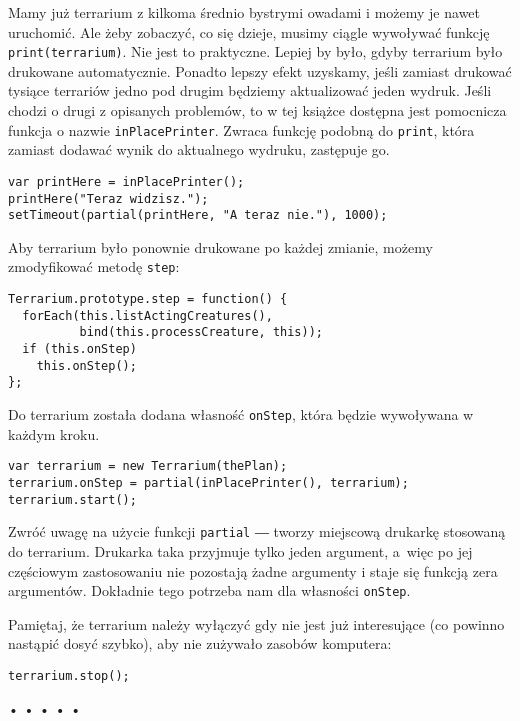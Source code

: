   
Mamy już terrarium z kilkoma średnio bystrymi owadami i możemy je nawet uruchomić. Ale żeby zobaczyć, co się dzieje, musimy ciągle wywoływać funkcję \texttt{print(terrarium)}. Nie jest to praktyczne. Lepiej by było, gdyby terrarium było drukowane automatycznie. Ponadto lepszy efekt uzyskamy, jeśli zamiast drukować tysiące terrariów jedno pod drugim będziemy aktualizować jeden wydruk. Jeśli chodzi o drugi z opisanych problemów, to w tej książce dostępna jest pomocnicza funkcja o nazwie \texttt{inPlacePrinter}. Zwraca funkcję podobną do \texttt{print}, która zamiast dodawać wynik do aktualnego wydruku, zastępuje go.

  
\begin{verbatim} 
var printHere = inPlacePrinter();
printHere("Teraz widzisz.");
setTimeout(partial(printHere, "A teraz nie."), 1000);
 \end{verbatim}
  
Aby terrarium było ponownie drukowane po każdej zmianie, możemy zmodyfikować metodę \texttt{step}:

  
\begin{verbatim} 
Terrarium.prototype.step = function() {
  forEach(this.listActingCreatures(),
          bind(this.processCreature, this));
  if (this.onStep)
    this.onStep();
};
 \end{verbatim}
  
Do terrarium została dodana własność \texttt{onStep}, która będzie wywoływana w każdym kroku.

  
\begin{verbatim} 
var terrarium = new Terrarium(thePlan);
terrarium.onStep = partial(inPlacePrinter(), terrarium);
terrarium.start();
 \end{verbatim}
  
Zwróć uwagę na użycie funkcji \texttt{partial} ― tworzy miejscową drukarkę stosowaną do terrarium. Drukarka taka przyjmuje tylko jeden argument, a~więc po jej częściowym zastosowaniu nie pozostają żadne argumenty i staje się funkcją zera argumentów. Dokładnie tego potrzeba nam dla własności \texttt{onStep}.

  
Pamiętaj, że terrarium należy wyłączyć gdy nie jest już interesujące (co powinno nastąpić dosyć szybko), aby nie zużywało zasobów komputera:

  
\begin{verbatim} 
terrarium.stop();
 \end{verbatim}


\begin{center}
• • • • •
\end{center}

